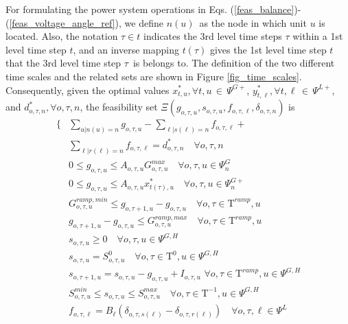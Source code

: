 \documentclass[final]{IEEEtran}
\newcommand{\myin}{\,{\in}\,}
\newcommand{\Tau}{\mathrm{T}}
\begin{document}
For formulating the power system operations in Eqs. (\ref{feas_balance})-(\ref{feas_voltage_angle_ref}), we define $n(u)$ as the node in which unit $u$ is located. Also, the notation $\tau \in t$ indicates the 3rd level time steps $\tau$ within a 1st level time step $t$, and an inverse mapping $t(\tau)$ gives the 1st level time step $t$ that the 3rd level time step $\tau$ is belongs to. The definition of the two different time scales and the related sets are shown in Figure \ref{fig_time_scales}. Consequently, given the optimal values \( x_{t, u}^*, \forall t, u \myin \Psi^{G+} \), \( y_{t, \ell}^*, \forall t, \ell \myin \Psi^{L+} \), and \( d_{o, \tau, n}^*, \forall o, \tau, n \), the feasibility set \( \Xi(g_{o, \tau, u}, s_{o, \tau, u}, f_{o, \tau, \ell}, \delta_{o, \tau, n}) \) is
\begin{align}
\{ &\sum\limits_{u | n(u) = n} g_{o, \tau, u} - \sum\limits_{\ell | s(\ell) = n} f_{o, \tau, \ell} + \nonumber \\
&\label{feas_balance} \sum\limits_{\ell | r(\ell) = n} f_{o, \tau, \ell} = d_{o, \tau, n}^* \quad \forall o, \tau, n\\
&\label{feas_availability1}0 \leq g_{o, \tau, u} \leq A_{o, \tau, u} G_{o, \tau, u}^{max} \quad \forall o, \tau, u \in \Psi_n^G \\
&\label{feas_availability2}0 \leq g_{o, \tau, u} \leq A_{o, \tau, u} x_{t(\tau), u}^* \quad \forall o, \tau, u \in \Psi_n^{G+} \\
&\label{feas_ramp1}G^{ramp,min}_{o, \tau, u} \leq g_{o, \tau + 1, u} - g_{o, \tau, u} \quad \forall o, \tau \in \Tau^{ramp}, u \\
&\label{feas_ramp2}g_{o, \tau + 1, u} - g_{o, \tau, u} \leq G^{ramp,max}_{o, \tau, u} \quad \forall o, \tau \in \Tau^{ramp}, u \\
&\label{feas_storage1}s_{o, \tau, u} \geq 0 \quad \forall o, \tau, u \in \Psi^{G, H} \\
&\label{feas_storage2}s_{o, \tau, u} = S^0_{o, \tau, u} \quad \forall o, \tau \in \Tau^0, u \in \Psi^{G, H} \\
&\label{feas_storage3}s_{o, \tau + 1, u} = s_{o, \tau, u} - g_{o, \tau, u} + I_{o, \tau, u} \, \, \forall o, \tau \in \Tau^{ramp}, u \in \Psi^{G, H} \\
&\label{feas_storage4}S^{min}_{o, \tau, u} \leq s_{o, \tau, u} \leq S^{max}_{o, \tau, u} \quad \forall o, \tau \in \Tau^{-1}, u \in \Psi^{G, H} \\
&\label{feas_flow_ac}f_{o, \tau, \ell} = B_\ell (\delta_{o, \tau, s(\ell)} - \delta_{o, \tau, r(\ell)}) \quad \forall o, \tau, \ell \in \Psi^L \\

\end{align}
\end{document}

